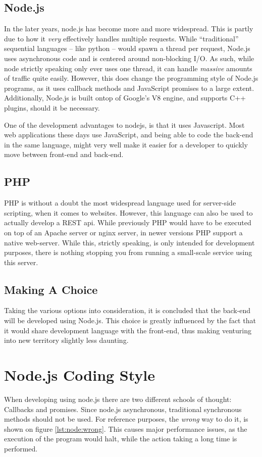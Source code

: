 		\subsection{Node.js}
			In the later years, node.js has become more and more widespread. This is partly due to how it \emph{very} effectively handles multiple requests. While ``traditional'' sequential languages -- like python -- would spawn a thread per request, Node.js uses asynchronous code and is centered around non-blocking I/O. As such, while node strictly speaking only ever uses one thread, it can handle \emph{massive} amounts of traffic quite easily. However, this does change the programming style of Node.js programs, as it uses callback methods and JavaScript promises to a large extent. Additionally, Node.js is built ontop of Google's V8 engine, and supports C++ plugins, should it be necessary.

			One of the development advantages to nodejs, is that it uses Javascript. Most web applications these days use JavaScript, and being able to code the back-end in the same language, might very well make it easier for a developer to quickly move between front-end and back-end.

		\subsection{PHP}
			PHP is without a doubt the most widespread language used for server-side scripting, when it comes to websites. However, this language can also be used to actually develop a REST api. While previously PHP would have to be executed on top of an Apache server or nginx server, in newer versions PHP support a native web-server. While this, strictly speaking, is only intended for development purposes, there is nothing stopping you from running a small-scale service using this server.

		\subsection{Making A Choice}
			Taking the various options into consideration, it is concluded that the back-end will be developed using Node.js. This choice is greatly influenced by the fact that it would share development language with the front-end, thus making venturing into new territory slightly less daunting.

	\section{Node.js Coding Style}
		When developing using node.js there are two different schools of thought: Callbacks and promises. Since node.js asynchronous, traditional synchronous methods should not be used. For reference purposes, the \emph{wrong} way to do it, is shown on figure \ref{lst:node:wrong}. This causes major performance issues, as the execution of the program would halt, while the action taking a long time is performed.

